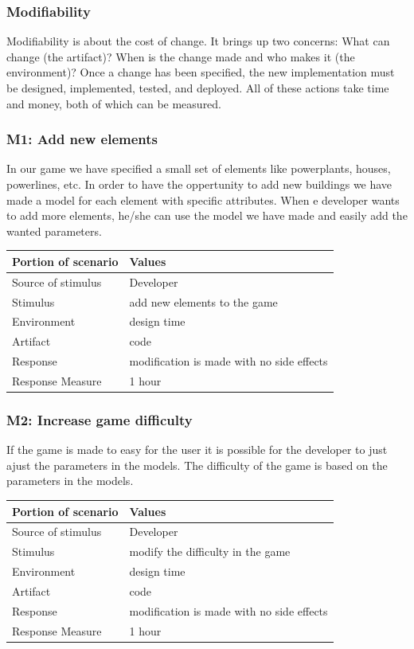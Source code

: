 \subsubsection{Modifiability}

Modifiability is about the cost of change. It brings up two concerns: What can change (the artifact)? 
When is the change made and who makes it (the environment)? 
Once a change has been specified, the new implementation must be designed, 
implemented, tested, and deployed. All of these actions take time and money, both of which can be measured.


\subsubsection*{M1: Add new elements}
In our game we have specified a small set of elements like powerplants, houses, powerlines, etc.
In order to have the oppertunity to add new buildings we have made a model for each element
with specific attributes. When e developer wants to add more elements, he/she can use the model
we have made and easily add the wanted parameters. 

\begin{tabular}{| l | l |}
	\hline
	{\bf Portion of scenario} & {\bf Values} \\ \hline
	Source of stimulus & Developer\\ \hline
	Stimulus & add new elements to the game\\ \hline
	Environment & design time \\ \hline
	Artifact &  code \\ \hline
	Response & modification is made with no side effects\\ \hline
	Response Measure & 1 hour\\ \hline
\end{tabular}

\subsubsection* {M2: Increase game difficulty}
If the game is made to easy for the user it is possible for the developer to just ajust the
parameters in the models. The difficulty of the game is based on the parameters
in the models. 

\begin{tabular}{| l | l |}
	\hline
	{\bf Portion of scenario} & {\bf Values} \\ \hline
	Source of stimulus & Developer\\ \hline
	Stimulus & modify the difficulty in the game\\ \hline
	Environment & design time \\ \hline
	Artifact & code \\ \hline
	Response & modification is made with no side effects\\ \hline
	Response Measure & 1 hour\\ \hline
\end{tabular}

